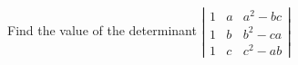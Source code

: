 
%
%
%
%
% 
% 

\question[1] Find the value of the determinant 
$\left|
  \begin{array}{ccc}
    1 & a & a^2-bc \\
    1 & b & b^2-ca \\
    1 & c & c^2-ab
  \end{array}
\right|
$


\ifprintanswers
\fi 

